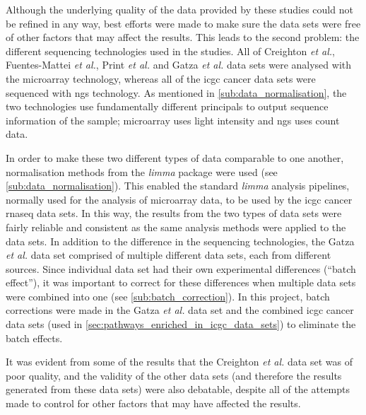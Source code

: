 Although the underlying quality of the data provided by these studies could not be refined in any way, best efforts were made to make sure the data sets were free of other factors that may affect the results.
This leads to the second problem: the different sequencing technologies used in the studies.
All of Creighton \textit{et al.}, Fuentes-Mattei \textit{et al.}, Print \textit{et al.} and Gatza \textit{et al.} data sets were analysed with the microarray technology, whereas all of the \gls{icgc} cancer data sets were sequenced with \gls{ngs} technology.
As mentioned in \cref{sub:data_normalisation}, the two technologies use fundamentally different principals to output sequence information of the sample; microarray uses light intensity and \gls{ngs} uses count data.

In order to make these two different types of data comparable to one another, normalisation methods from the \textit{limma} package were used (see \cref{sub:data_normalisation}).
This enabled the standard \textit{limma} analysis pipelines, normally used for the analysis of microarray data, to be used by the \gls{icgc} cancer \gls{rnaseq} data sets.
In this way, the results from the two types of data sets were fairly reliable and consistent as the same analysis methods were applied to the data sets.
In addition to the difference in the sequencing technologies, the Gatza \textit{et al.} data set comprised of multiple different data sets, each from different sources.
Since individual data set had their own experimental differences (``batch effect''), it was important to correct for these differences when multiple data sets were combined into one (see \cref{sub:batch_correction}).
In this project, batch corrections were made in the Gatza \textit{et al.} data set and the combined \gls{icgc} cancer data sets (used in \cref{sec:pathways_enriched_in_icgc_data_sets}) to eliminate the batch effects.

It was evident from some of the results that the Creighton \textit{et al.} data set was of poor quality, and the validity of the other data sets (and therefore the results generated from these data sets) were also debatable, despite all of the attempts made to control for other factors that may have affected the results.



